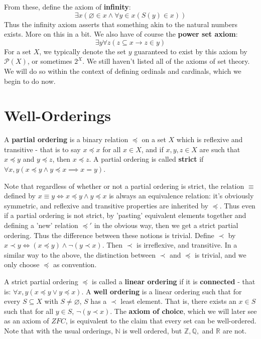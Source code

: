 \documentclass{article}
\theoremstyle{definition}
\theoremstyle{plain}
\theoremstyle{theorem}
\begin{document}
From these, define the axiom of \textbf{infinity}: 
\[  \exists x (\varnothing \in x \wedge \forall y \in x(S(y) \in x)) \]  
Thus the infinity axiom asserts that something akin to the natural numbers exists. More on this in a bit. We also have of course the \textbf{power set axiom}:
\[ \exists y \forall z (z \subseteq x \rightarrow z \in y) \]
For a set $X$, we typically denote the set $y$ guaranteed to exist by this axiom by $\mathcal{P}(X)$, or sometimes $2^X$. 
We still haven't listed all of the axioms of set theory. We will do so within the context of defining ordinals and cardinals, which we begin to do now.  \par 
\section{Well-Orderings}
A \textbf{partial ordering} is a binary relation $\preceq$ on a set $X$ which is reflexive and transitive - that is to say $x \preceq x$ for all $x \in X$, and if $x,y,z \in X$ are such that $x \preceq y$ and $y \preceq z$, then $x \preceq z$. A partial ordering is called \textbf{strict} if $\forall x,y(x \preceq y \wedge y \preceq x \implies x = y)$. \par 
	Note that regardless of whether or not a partial ordering is strict, the relation $\equiv$ defined by $x \equiv y \iff x \preceq y \wedge y \preceq x$ is always an equivalence relation: it's obviously symmetric, and reflexive and transitive properties are inherited by $\preceq$. Thus even if a partial ordering is not strict, by 'pasting' equivalent elements together and defining a 'new' relation $\preceq '$ in the obvious way, then we get a strict partial ordering. Thus the difference between these notions is trivial. Define $\prec$ by $x \prec y \iff (x \preceq y) \wedge \neg(y \prec x)$. Then $\prec$ is irreflexive, and transitive. In a similar way to the above, the distinction between $\prec$ and $\preceq$ is trivial, and we only choose $\preceq$ as convention. \par 
	A strict partial ordering $\preceq$ is called a \textbf{linear ordering} if it is \textbf{connected} - that is: $\forall x,y (x \preceq y \vee y \preceq x)$. A \textbf{well ordering} is a linear ordering such that for every $S \subseteq X$ with $S \neq \varnothing$, $S$ has a $\prec$ least element. That is, there exists an $x \in S$ such that for all $y \in S$, $\neg(y \prec x)$. The \textbf{axiom of choice}, which we will later see as an axiom of $ZFC$, is equivalent to the claim that every set can be well-ordered. Note that with the usual orderings, $\mathbb{N}$ is well ordered, but $\mathbb{Z},\mathbb{Q},$ and $\mathbb{R}$ are not. \par 
\end{document}
